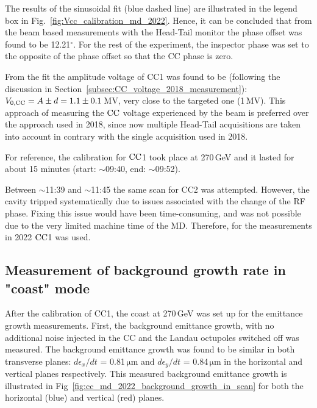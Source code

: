 The results of the sinusoidal fit (blue dashed line) are illustrated in the legend box in Fig.~\ref{fig:Vcc_calibration_md_2022}. Hence, it can be concluded that from the beam based measurements with the Head-Tail monitor the phase offset was found to be 12.21$^\circ$. For the rest of the experiment, the inspector phase was set to the opposite of the phase offset so that the CC phase is zero. 

From the fit the amplitude voltage of CC1 was found to be (following the discussion in Section~\ref{subsec:CC_voltage_2018_measurement}): ${V_\mathrm{0, CC}}=A \pm d = 1.1 \pm 0.1$\,MV, very close to the targeted one (1\,MV). This approach of measuring the ${\mathrm{CC}}$ voltage experienced by the beam is preferred over the approach used in 2018, since now multiple Head-Tail acquisitions are taken into account in contrary with the single acquisition used in 2018.  



For reference, the calibration for ${\mathrm{CC}}$1 took place at 270\,GeV and it lasted for about 15 minutes (start: $\sim$09:40, end: $\sim$09:52).


Between $\sim$11:39 and $\sim$11:45 the same scan for CC2 was attempted. However, the cavity tripped systematically due to issues associated with the change of the RF phase. Fixing this issue would have been time-consuming, and was not possible due to the very limited machine time of the MD. Therefore, for the measurements in 2022 ${\mathrm{CC}}$1 was used.

\subsection{Measurement of background growth rate in "coast" mode}\label{subsec:measured_background_growth_cc_md_2022}
After the calibration of CC1, the coast at 270\,GeV was set up for the emittance growth measurements. First, the background emittance growth, with no additional noise injected in the CC and the Landau octupoles switched off was measured. The background emittance growth was found to be similar in both transverse planes: $d\epsilon_x /dt$ = 0.81\,$\mathrm{\mu m}$ and $d\epsilon_y /dt$ = 0.84\,$\mathrm{\mu m}$ in the horizontal and vertical planes respectively. This measured background emittance growth is illustrated in Fig~\ref{fig:cc_md_2022_background_growth_in_scan} for both the horizontal (blue) and vertical (red) planes.

